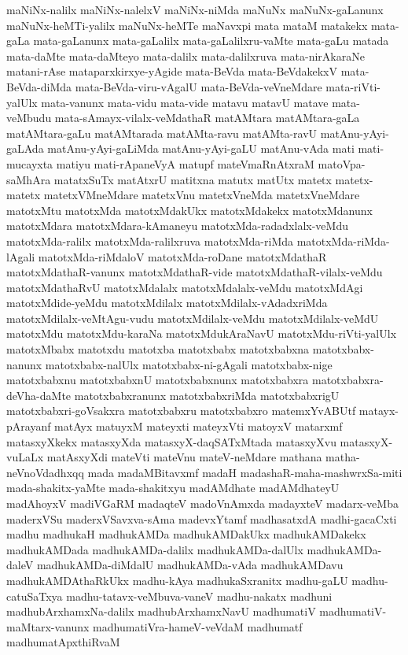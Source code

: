 {maNiNx-nalilx
maNiNx-nalelxV
maNiNx-niMda
maNuNx
maNuNx-gaLanunx
maNuNx-heMTi-yalilx
maNuNx-heMTe
maNavxpi
mata
mataM
matakekx
mata-gaLa
mata-gaLanunx
mata-gaLalilx
mata-gaLalilxru-vaMte
mata-gaLu
matada
mata-daMte
mata-daMteyo
mata-dalilx
mata-dalilxruva
mata-nirAkaraNe
matani-rAse
mataparxkirxye-yAgide
mata-BeVda
mata-BeVdakekxV
mata-BeVda-diMda
mata-BeVda-viru-vAgalU
mata-BeVda-veVneMdare
mata-riVti-yalUlx
mata-vanunx
mata-vidu
mata-vide
matavu
matavU
matave
mata-veMbudu
mata-sAmayx-vilalx-veMdathaR
matAMtara
matAMtara-gaLa
matAMtara-gaLu
matAMtarada
matAMta-ravu
matAMta-ravU
matAnu-yAyi-gaLAda
matAnu-yAyi-gaLiMda
matAnu-yAyi-gaLU
matAnu-vAda
mati
mati-mucayxta
matiyu
mati-rApaneVyA
matupf
mateVmaRnAtxraM
matoVpa-saMhAra
matatxSuTx
matAtxrU
matitxna
matutx
matUtx
matetx
matetx-matetx
matetxVMneMdare
matetxVnu
matetxVneMda
matetxVneMdare
matotxMtu
matotxMda
matotxMdakUkx
matotxMdakekx
matotxMdanunx
matotxMdara
matotxMdara-kAmaneyu
matotxMda-radadxlalx-veMdu
matotxMda-ralilx
matotxMda-ralilxruva
matotxMda-riMda
matotxMda-riMda-lAgali
matotxMda-riMdaloV
matotxMda-roDane
matotxMdathaR
matotxMdathaR-vanunx
matotxMdathaR-vide
matotxMdathaR-vilalx-veMdu
matotxMdathaRvU
matotxMdalalx
matotxMdalalx-veMdu
matotxMdAgi
matotxMdide-yeMdu
matotxMdilalx
matotxMdilalx-vAdadxriMda
matotxMdilalx-veMtAgu-vudu
matotxMdilalx-veMdu
matotxMdilalx-veMdU
matotxMdu
matotxMdu-karaNa
matotxMdukAraNavU
matotxMdu-riVti-yalUlx
matotxMbabx
matotxdu
matotxba
matotxbabx
matotxbabxna
matotxbabx-nanunx
matotxbabx-nalUlx
matotxbabx-ni-gAgali
matotxbabx-nige
matotxbabxnu
matotxbabxnU
matotxbabxnunx
matotxbabxra
matotxbabxra-deVha-daMte
matotxbabxranunx
matotxbabxriMda
matotxbabxrigU
matotxbabxri-goVsakxra
matotxbabxru
matotxbabxro
matemxYvABUtf
matayx-pArayanf
matAyx
matuyxM
mateyxti
mateyxVti
matoyxV
matarxmf
matasxyXkekx
matasxyXda
matasxyX-daqSATxMtada
matasxyXvu
matasxyX-vuLaLx
matAsxyXdi
mateVti
mateVnu
mateV-neMdare
mathana
matha-neVnoVdadhxqq
mada
madaMBitavxmf
madaH
madashaR-maha-mashwrxSa-miti
mada-shakitx-yaMte
mada-shakitxyu
madAMdhate
madAMdhateyU
madAhoyxV
madiVGaRM
madaqteV
madoVnAmxda
madayxteV
madarx-veMba
maderxVSu
maderxVSavxva-sAma
madevxYtamf
madhasatxdA
madhi-gacaCxti
madhu
madhukaH
madhukAMDa
madhukAMDakUkx
madhukAMDakekx
madhukAMDada
madhukAMDa-dalilx
madhukAMDa-dalUlx
madhukAMDa-daleV
madhukAMDa-diMdalU
madhukAMDa-vAda
madhukAMDavu
madhukAMDAthaRkUkx
madhu-kAya
madhukaSxranitx
madhu-gaLU
madhu-catuSaTxya
madhu-tatavx-veMbuva-vaneV
madhu-nakatx
madhuni
madhubArxhamxNa-dalilx
madhubArxhamxNavU
madhumatiV
madhumatiV-maMtarx-vanunx
madhumatiVra-hameV-veVdaM
madhumatf
madhumatApxthiRvaM
}
